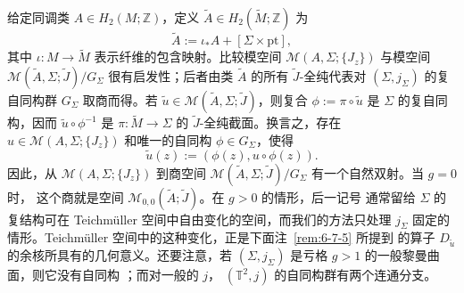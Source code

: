 \begin{remark}\label{rem:6-7-2}
给定同调类 $A\in H_2(M;\mathbb Z)$，定义 $\widetilde A\in H_2(\widetilde M;\mathbb Z)$ 为
\[
  \widetilde A:=\iota_*A+[\Sigma\times\mathrm{pt}],
\]
其中 $\iota:M\to\widetilde M$ 表示纤维的包含映射。比较模空间
$\mathcal M(A,\Sigma;\{J_z\})$ 与模空间
$\mathcal M(\widetilde A,\Sigma;\widetilde J)/G_\Sigma$ 很有启发性；后者由类
$\widetilde A$ 的所有 $\widetilde J$-全纯代表对 $(\Sigma,j_\Sigma)$ 的复自同构群
$G_\Sigma$ 取商而得。若
$\widetilde u\in\mathcal M(\widetilde A,\Sigma;\widetilde J)$，则复合
$\phi:=\pi\circ\widetilde u$ 是 $\Sigma$ 的复自同构，因而
$\widetilde u\circ\phi^{-1}$ 是 $\pi:\widetilde M\to\Sigma$ 的
$\widetilde J$-全纯截面。换言之，存在
$u\in\mathcal M(A,\Sigma;\{J_z\})$ 和唯一的自同构 $\phi\in G_\Sigma$，使得
\[
  \widetilde u(z):=(\phi(z),u\circ\phi(z)).
\]
因此，从 $\mathcal M(A,\Sigma;\{J_z\})$ 到商空间
$\mathcal M(\widetilde A,\Sigma;\widetilde J)/G_\Sigma$ 有一个自然双射。当 $g=0$ 时，
这个商就是空间 $\mathcal M_{0,0}(\widetilde A;\widetilde J)$。在 $g>0$ 的情形，后一记号
通常留给 $\Sigma$ 的复结构可在 Teichmüller 空间中自由变化的空间，而我们的方法只处理
$j_\Sigma$ 固定的情形。Teichmüller 空间中的这种变化，正是下面注~\ref{rem:6-7-5} 所提到
的算子 $D_{\widetilde u}$ 的余核所具有的几何意义。还要注意，若
$(\Sigma,j_\Sigma)$ 是亏格 $g>1$ 的一般黎曼曲面，则它没有自同构
；而对一般的 $j$，
$(\mathbb T^2,j)$ 的自同构群有两个连通分支。
\end{remark}

